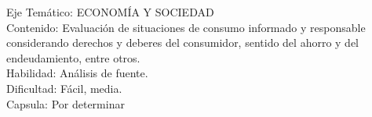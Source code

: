 \documentclass[letterpaper,11pt]{article}
\newcommand{\anchopregunta}{0.9\textwidth}
\begin{document}
\begin{enumerate}
\begin{minipage}{\anchopregunta}
\begin{answer}
\end{answer}
\begin{info} %
\begin{flushleft}
Eje Temático: ECONOMÍA Y SOCIEDAD\\
Contenido: Evaluación de situaciones de consumo informado y responsable considerando derechos y deberes del consumidor, sentido del ahorro y del endeudamiento, entre otros.\\
Habilidad: Análisis de fuente.\\
Dificultad: Fácil, media.\\
Capsula: Por determinar \\
\end{flushleft} 
\end{info}
\end{minipage}\vfill$\;$ %

\end{enumerate}
\end{document}
